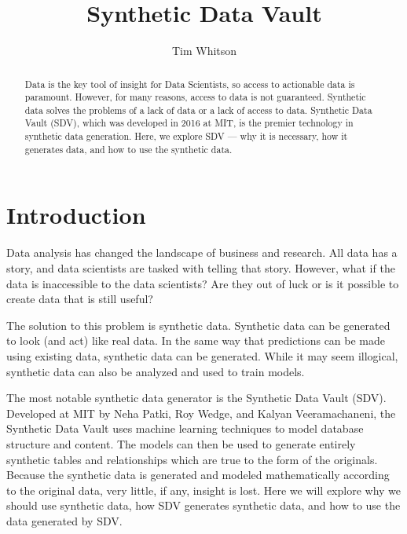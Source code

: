 
\title{Synthetic Data Vault}

\author{Tim Whitson}

\renewcommand{\shortauthors}{T. Whitson}

\begin{abstract}
Data is the key tool of insight for Data Scientists, so access to
actionable data is paramount. However, for many reasons, access to data is
not guaranteed. Synthetic data solves the problems of a lack of data or a
lack of access to data. Synthetic Data Vault (SDV), which was developed in
2016 at MIT, is the premier technology in synthetic data generation. Here,
we explore SDV --- why it is necessary, how it generates data, and how to
use the synthetic data.
\end{abstract}


\maketitle

\section{Introduction}

Data analysis has changed the landscape of business and research. All data
has a story, and data scientists are tasked with telling that story. However,
what if the data is inaccessible to the data scientists? Are they out of
luck or is it possible to create data that is still useful?

The solution to this problem is synthetic data. Synthetic data can be generated
to look (and act) like real data. In the same way that predictions can be
made using existing data, synthetic data can be generated. While it may seem
illogical, synthetic data can also be analyzed and used to train models.

The most notable synthetic data generator is the Synthetic Data Vault
(SDV). Developed at MIT by Neha Patki, Roy Wedge, and Kalyan Veeramachaneni,
the Synthetic Data Vault uses machine learning techniques to model database
structure and content. The models can then be used to generate entirely
synthetic tables and relationships which are true to the form of the
originals. Because the synthetic data is generated and modeled mathematically
according to the original data, very little, if any, insight is lost. Here
we will explore why we should use synthetic data, how SDV generates synthetic
data, and how to use the data generated by SDV.\cite{hid-sp18-526-patki-sdv}


